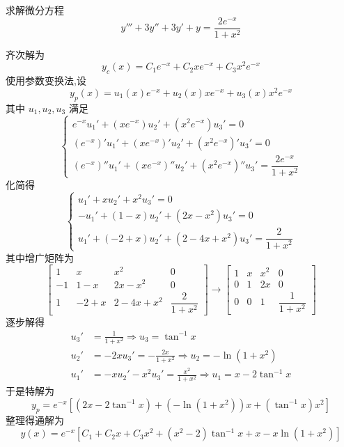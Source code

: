 \begin{questions}
    \question 求解微分方程
    \[
    y'''+3y''+3y'+y=\frac{2e^{-x}}{1+x^2}
    \]
    \begin{solution}  
        齐次解为
        \[
        y_c(x) = C_1 e^{-x} + C_2 x e^{-x} + C_3 x^2 e^{-x}
        \]
        使用参数变换法,设
        \[
        y_p(x) = u_1(x) e^{-x} + u_2(x) x e^{-x} + u_3(x) x^2 e^{-x}
        \]
        其中 $u_1, u_2, u_3$ 满足
        \[
        \begin{cases}
        e^{-x} u_1' + (xe^{-x}) u_2' + (x^2 e^{-x}) u_3' = 0 \\
        (e^{-x})' u_1' + (xe^{-x})' u_2' + (x^2 e^{-x})' u_3' = 0 \\
        (e^{-x})'' u_1' + (xe^{-x})'' u_2' + (x^2 e^{-x})'' u_3' = \dfrac{2e^{-x}}{1+x^2}
        \end{cases}
        \]
        化简得
        \[
        \begin{cases}
        u_1' + x u_2' + x^2 u_3' = 0 \\
        -u_1' + (1-x) u_2' + (2x - x^2) u_3' = 0 \\
        u_1' + (-2+x) u_2' + (2 - 4x + x^2) u_3' = \dfrac{2}{1+x^2}
        \end{cases}
        \]
        其中增广矩阵为
        \[
        \left[
        \begin{array}{ccc|c}
        1 & x & x^2 & 0 \\
        -1 & 1-x & 2x-x^2 & 0 \\
        1 & -2+x & 2-4x+x^2 & \dfrac{2}{1+x^2}
        \end{array}
        \right] \to
        \left[
        \begin{array}{ccc|c}
        1 & x & x^2 & 0 \\
        0 & 1 & 2x & 0 \\
        0 & 0 & 1 & \dfrac{1}{1+x^2}
        \end{array}
        \right]
        \]
        逐步解得
        \begin{align*}
        u_3' &= \frac{1}{1+x^2} \Rightarrow u_3 = \tan^{-1} x \\
        u_2' &= -2x u_3' = -\frac{2x}{1+x^2} \Rightarrow u_2 = -\ln(1+x^2) \\
        u_1' &= -x u_2' - x^2 u_3' = \frac{x^2}{1+x^2} \Rightarrow u_1 = x - 2 \tan^{-1} x
        \end{align*}
        于是特解为
        \[
        y_p = e^{-x} \left[ (2x - 2\tan^{-1}x) + (-\ln(1+x^2)) x + (\tan^{-1} x) x^2 \right]
        \]
        整理得通解为
        \[
        y(x) = e^{-x}\left[C_1 + C_2 x + C_3 x^2+(x^2-2)\tan^{-1}x + x-x\ln(1+x^2) \right]
        \]
    \end{solution}


\end{questions}
